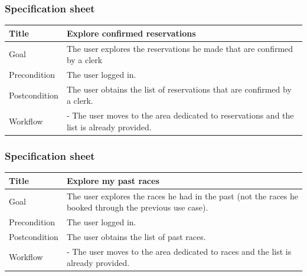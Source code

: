 \documentclass{beamer}
\begin{document}
\begin{frame}
    \frametitle{Specification sheet}
    \begin{table}
        \tiny
        \begin{tabular}{|p{2cm}|p{6cm}|}
        \hline
        Title & \textbf{Explore confirmed reservations} \\
        \hline
        Goal & The user explores the reservations he made that are confirmed by a clerk \\
        \hline
        Precondition & The user logged in. \\
        \hline
        Postcondition & The user obtains the list of reservations that are confirmed by a clerk. \\
        \hline
        Workflow &
        - The user moves to the area dedicated to reservations and the list is already provided. \\
        \hline
        \end{tabular}
\end{table}
\end{frame}

\begin{frame}
    \frametitle{Specification sheet}
    \begin{table}
        \tiny
        \begin{tabular}{|p{2cm}|p{6cm}|}
        \hline
        Title & \textbf{Explore my past races} \\
        \hline
        Goal & The user explores the races he had in the past (not the races he booked through the previous 
        use case). \\
        \hline
        Precondition & The user logged in. \\
        \hline  
        Postcondition & The user obtains the list of past races. \\
        \hline
        Workflow &
        - The user moves to the area dedicated to races
        and the list is already provided. \\
        \hline
        \end{tabular}
\end{table}
\end{frame}
\end{document}

